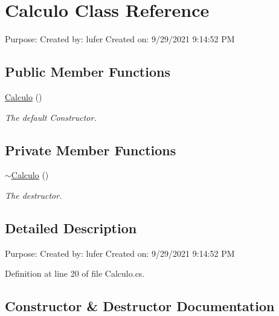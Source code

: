 \hypertarget{classAula1_1_1Calculo}{}\section{Calculo Class Reference}
\label{classAula1_1_1Calculo}


Purpose\+: Created by\+: lufer Created on\+: 9/29/2021 9\+:14\+:52 PM  


\subsection*{Public Member Functions}
\begin{DoxyCompactItemize}
\item 
\mbox{\hyperlink{classAula1_1_1Calculo_ae888a9095a6c33a1e41753a47ae556b0}{Calculo}} ()
\begin{DoxyCompactList}\small\item\em The default Constructor. \end{DoxyCompactList}\end{DoxyCompactItemize}
\subsection*{Private Member Functions}
\begin{DoxyCompactItemize}
\item 
\mbox{\hyperlink{classAula1_1_1Calculo_a2e0ec1e880e01bc6df0c6210773ab2ce}{$\sim$\+Calculo}} ()
\begin{DoxyCompactList}\small\item\em The destructor. \end{DoxyCompactList}\end{DoxyCompactItemize}


\subsection{Detailed Description}
Purpose\+: Created by\+: lufer Created on\+: 9/29/2021 9\+:14\+:52 PM 



Definition at line 20 of file Calculo.\+cs.



\subsection{Constructor \& Destructor Documentation}
\mbox{\label{classAula1_1_1Calculo_ae888a9095a6c33a1e41753a47ae556b0}} 
